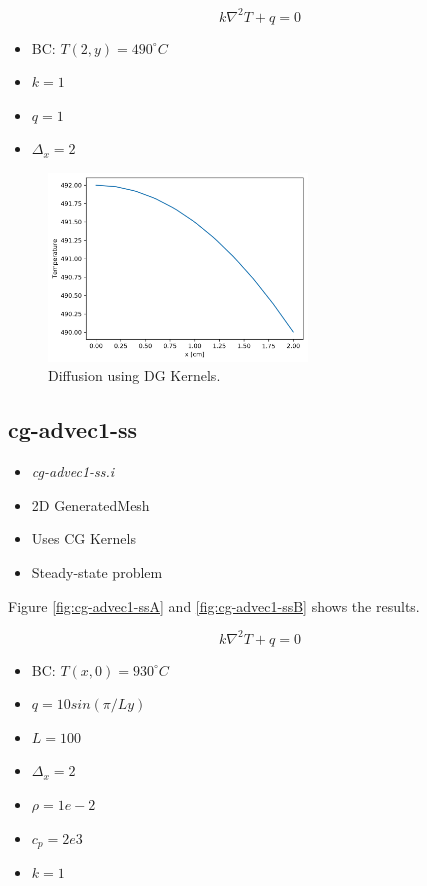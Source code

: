 \documentclass[11pt,letterpaper]{article}
\begin{document}
	\begin{equation}
    	k \nabla^2 T + q = 0
	\end{equation}

	\begin{itemize}
		\item BC: $T(2, y) = 490^{\circ}C$
		\item $k = 1$
		\item $q = 1$
		\item $\Delta_x = 2$
	\end{itemize}

	\begin{figure}[htbp!]
		\centering
		\includegraphics[height=5cm]{diff1-ss_across}
		\caption{Diffusion using DG Kernels.}
		\label{fig:diff1-ss}
	\end{figure}

	\subsection{cg-advec1-ss}

	\begin{itemize}
		\item \textit{cg-advec1-ss.i}
		\item 2D GeneratedMesh
		\item Uses CG Kernels
		\item Steady-state problem
	\end{itemize}

    Figure \ref{fig:cg-advec1-ssA} and \ref{fig:cg-advec1-ssB} shows the results.

	\begin{equation}
    	k \nabla^2 T + q = 0
	\end{equation}

	\begin{itemize}
		\item BC: $T(x, 0) = 930^{\circ}C$
		\item $q = 10 sin (\pi/L y)$
		\item $L = 100$
		\item $\Delta_x = 2$
		\item $\rho = 1e-2$
		\item $c_p = 2e3$
		\item $k = 1$
	\end{itemize}
\end{document}
